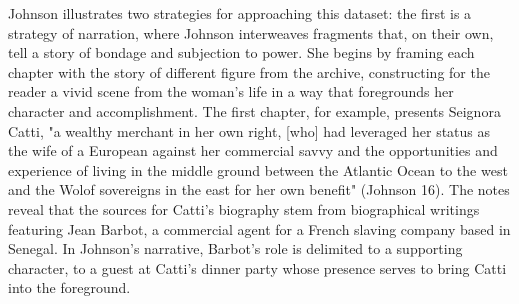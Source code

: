 \documentclass[11pt]{article}
\begin{document}
Johnson illustrates two strategies for approaching this dataset: the
first is a strategy of narration, where Johnson interweaves fragments
that, on their own, tell a story of bondage and subjection to
power. She begins by framing each chapter with the story of different
figure from the archive, constructing for the reader a vivid scene
from the woman's life in a way that foregrounds her character and
accomplishment. The first chapter, for example, presents Seignora
Catti, "a wealthy merchant in her own right, [who] had leveraged her
status as the wife of a European against her commercial savvy and the
opportunities and experience of living in the middle ground between
the Atlantic Ocean to the west and the Wolof sovereigns in the east
for her own benefit" (Johnson 16). The notes reveal that the sources
for Catti's biography stem from biographical writings featuring Jean
Barbot, a commercial agent for a French slaving company based in
Senegal. In Johnson's narrative, Barbot's role is delimited to a
supporting character, to a guest at Catti's dinner party whose
presence serves to bring Catti into the foreground.
\end{document}
